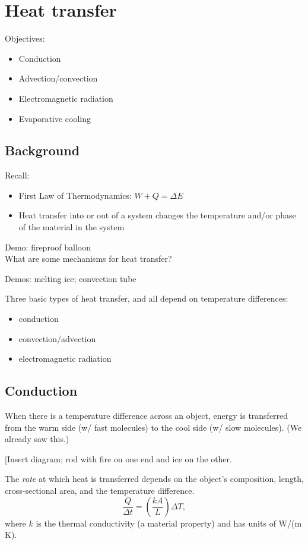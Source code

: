 \section{Heat transfer}
Objectives:
\begin{itemize}
\item Conduction
\item Advection/convection
\item Electromagnetic radiation
\item Evaporative cooling
\end{itemize}

\subsection{Background}
Recall:
\begin{itemize}
\item First Law of Thermodynamics: $W+Q=\Delta E$
\item Heat transfer into or out of a system changes the temperature and/or phase of the material in the system
\end{itemize}

Demo: fireproof balloon\\

What are some mechanisms for heat transfer?

Demos:  melting ice; convection tube

Three basic types of heat transfer, and all depend on temperature differences:
\begin{itemize}
\item conduction
\item convection/advection
\item electromagnetic radiation
\end{itemize}

\subsection{Conduction}
When there is a temperature difference across an object, energy is transferred from the warm side (w/ fast molecules) to the cool side (w/ slow molecules). (We already saw this.)

[Insert diagram; rod with fire on one end and ice on the other.
\vspace{5cm}
  
The \textit{rate} at which heat is transferred depends on the object's composition, length, cross-sectional area, and the temperature difference.
$$\frac{Q}{\Delta{t}}=\left(\frac{kA}{L}\right)\Delta{T},$$
where $k$ is the thermal conductivity (a material property) and has units of W/(m K).

